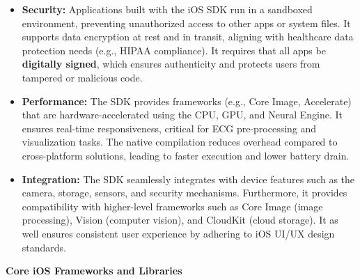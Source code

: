 \begin{itemize}
    \item \textbf{Security:}  Applications built with the iOS SDK run in a sandboxed environment, preventing unauthorized access to other apps or system files. It supports data encryption at rest and in transit, aligning with healthcare data protection needs (e.g., HIPAA compliance). It requires that all apps be \textbf{digitally signed}, which ensures authenticity and protects users from tampered or malicious code.  
    \item \textbf{Performance:} The SDK provides frameworks (e.g., Core Image, Accelerate) that are hardware-accelerated using the CPU, GPU, and Neural Engine. It ensures real-time responsiveness, critical for ECG pre-processing and visualization tasks. The native compilation reduces overhead compared to cross-platform solutions, leading to faster execution and lower battery drain.  
    \item \textbf{Integration:} The SDK seamlessly integrates with device features such as the camera, storage, sensors, and security mechanisms. Furthermore, it provides compatibility with higher-level frameworks such as Core Image (image processing), Vision (computer vision), and CloudKit (cloud storage). It as well ensures consistent user experience by adhering to iOS UI/UX design standards.
\end{itemize}

\textbf{Core iOS Frameworks and Libraries}

